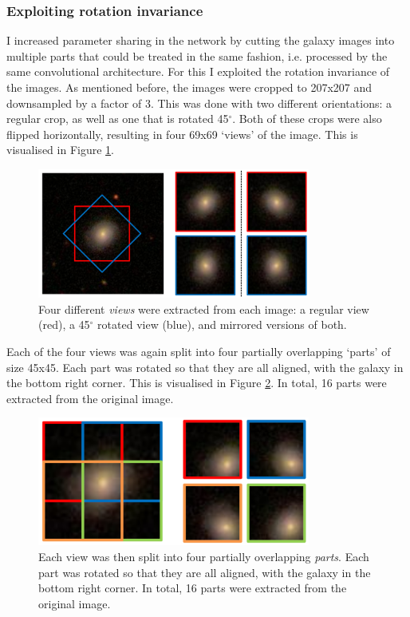 \documentclass[a4paper,10pt]{article}
\begin{document}
\subsubsection{Exploiting rotation invariance}
\label{sec:exploiting-rotation-invariance}
I increased parameter sharing in the network by cutting the galaxy images into multiple parts that could be treated in the same fashion, i.e. processed by the same convolutional architecture. For this I exploited the rotation invariance of the images. As mentioned before, the images were cropped to 207x207 and downsampled by a factor of 3. This was done with two different orientations: a regular crop, as well as one that is rotated 45$^\circ$. Both of these crops were also flipped horizontally, resulting in four 69x69 `views' of the image. This is visualised in Figure \ref{fig:schema-views}.

\begin{figure}
        \centering
	\includegraphics[width=0.8\textwidth]{schema_views.png}
        \caption{Four different \textit{views} were extracted from each image: a regular view (red), a 45$^\circ$ rotated view (blue), and mirrored versions of both.}\label{fig:schema-views}
\end{figure}


Each of the four views was again split into four partially overlapping `parts' of size 45x45. Each part was rotated so that they are all aligned, with the galaxy in the bottom right corner. This is visualised in Figure \ref{fig:schema-parts}. In total, 16 parts were extracted from the original image.

\begin{figure}
        \centering
	\includegraphics[width=0.8\textwidth]{schema_parts.png}
        \caption{Each view was then split into four partially overlapping \textit{parts}. Each part was rotated so that they are all aligned, with the galaxy in the bottom right corner. In total, 16 parts were extracted from the original image.}\label{fig:schema-parts}
\end{figure}
\end{document}

